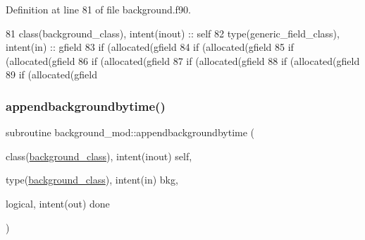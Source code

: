 Definition at line 81 of file background.\+f90.


\begin{DoxyCode}
81     \textcolor{keywordtype}{class}(background\_class), \textcolor{keywordtype}{intent(inout)} :: self
82     \textcolor{keywordtype}{type}(generic\_field\_class), \textcolor{keywordtype}{intent(in)} :: gfield
83     \textcolor{keywordflow}{if} (\textcolor{keyword}{allocated}(gfield%
84     \textcolor{keywordflow}{if} (\textcolor{keyword}{allocated}(gfield%
85     \textcolor{keywordflow}{if} (\textcolor{keyword}{allocated}(gfield%
86     \textcolor{keywordflow}{if} (\textcolor{keyword}{allocated}(gfield%
87     \textcolor{keywordflow}{if} (\textcolor{keyword}{allocated}(gfield%
88     \textcolor{keywordflow}{if} (\textcolor{keyword}{allocated}(gfield%
89     \textcolor{keywordflow}{if} (\textcolor{keyword}{allocated}(gfield%
\end{DoxyCode}
\mbox{\label{namespacebackground__mod_a02fa44cb4575159362bfa3b55520d387}} 
\subsubsection{\texorpdfstring{appendbackgroundbytime()}{appendbackgroundbytime()}}
{\footnotesize\ttfamily subroutine background\+\_\+mod\+::appendbackgroundbytime (\begin{DoxyParamCaption}\item[{class(\mbox{\hyperlink{structbackground__mod_1_1background__class}{background\+\_\+class}}), intent(inout)}]{self,  }\item[{type(\mbox{\hyperlink{structbackground__mod_1_1background__class}{background\+\_\+class}}), intent(in)}]{bkg,  }\item[{logical, intent(out)}]{done }\end{DoxyParamCaption})\hspace{0.3cm}{\ttfamily [private]}}



